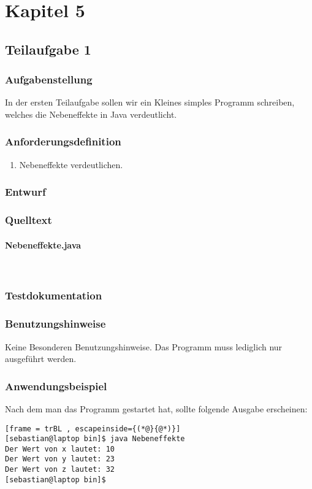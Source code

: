 \section{Kapitel 5}
\subsection{Teilaufgabe 1}
\subsubsection{Aufgabenstellung}
In der ersten Teilaufgabe sollen wir ein Kleines simples Programm schreiben,
welches die Nebeneffekte in Java verdeutlicht.

\subsubsection{Anforderungsdefinition}
\begin{enumerate}
	\item Nebeneffekte verdeutlichen.
\end{enumerate}

\subsubsection{Entwurf}


\subsubsection{Quelltext}
\paragraph{Nebeneffekte.java}\


\subsubsection{Testdokumentation}

\subsubsection{Benutzungshinweise}
Keine Besonderen Benutzungshinweise.
Das Programm muss lediglich nur ausgeführt werden.

\subsubsection{Anwendungsbeispiel}
Nach dem man das Programm gestartet hat, sollte folgende Ausgabe erscheinen:
\begin{lstlisting}[frame = trBL , escapeinside={(*@}{@*)}]
[sebastian@laptop bin]$ java Nebeneffekte 
Der Wert von x lautet: 10
Der Wert von y lautet: 23
Der Wert von z lautet: 32
[sebastian@laptop bin]$ 
\end{lstlisting}
